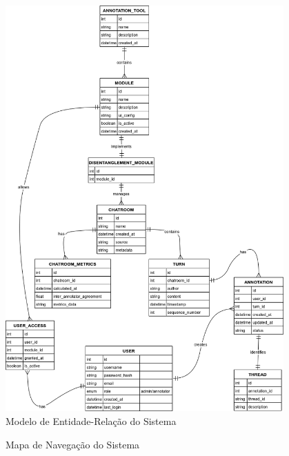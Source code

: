 \begin{figure}[p]
    \centering
    \includegraphics[width=0.95\textwidth,height=0.95\textheight,keepaspectratio]{images/Modelo_Entidade-Relacao.drawio.png}
    \caption{Modelo de Entidade-Relação do Sistema}
    \label{fig:modelo-er}
\end{figure}

\begin{landscape}
    \begin{figure}[p]
        \centering
        \caption{Mapa de Navegação do Sistema}
        \label{fig:mapa-navegacao}
    \end{figure}
\end{landscape}